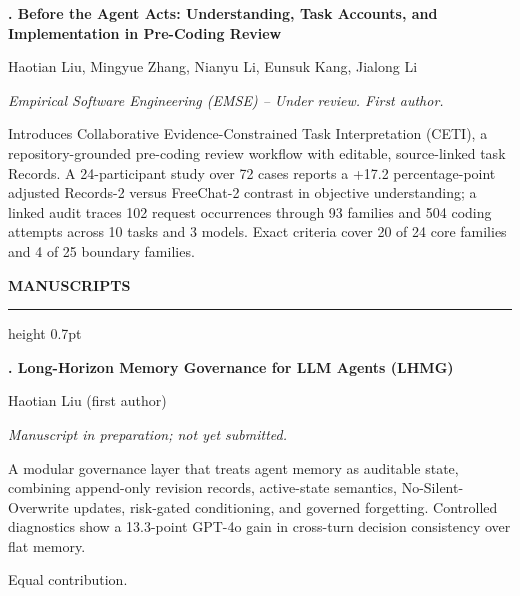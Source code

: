 \documentclass[10pt,a4paper]{article}
\newcommand{\pubsection}[1]{%
  \vspace{10pt}%
  {\sffamily\bfseries\fontsize{12.5}{15.2}\selectfont
    \color{navy}\MakeUppercase{#1}}\par
  \vspace{2pt}%
  {\color{rule}\hrule height 0.7pt}\vspace{7pt}%
}
\newcommand{\pubentry}[5]{%
  {\sffamily\bfseries\fontsize{11.7}{14.2}\selectfont #1}\par
  {\fontsize{10.5}{13.6}\selectfont #2}\par
  {\fontsize{10.4}{13.6}\selectfont\itshape #3}\par
  {\fontsize{10.35}{13.5}\selectfont #4}\par
  {\fontsize{10.6}{15.0}\selectfont #5}\par
  \vspace{8pt}%
}
\begin{document}
\pubentry
  {4. Before the Agent Acts: Understanding, Task Accounts, and\\Implementation in Pre-Coding Review}
  {Haotian Liu, Mingyue Zhang, Nianyu Li, Eunsuk Kang, Jialong Li}
  {Empirical Software Engineering (EMSE) -- Under review. First author.}
  {}
  {Introduces Collaborative Evidence-Constrained Task Interpretation (CETI),
   a repository-grounded pre-coding review workflow with editable,
   source-linked task Records. A 24-participant study over 72 cases reports a
   +17.2 percentage-point adjusted Records-2 versus FreeChat-2 contrast in
   objective understanding; a linked audit traces 102 request occurrences
   through 93 families and 504 coding attempts across 10 tasks and 3 models.
   Exact criteria cover 20 of 24 core families and 4 of 25 boundary families.}

\pubsection{Manuscripts}

\pubentry
  {5. Long-Horizon Memory Governance for LLM Agents (LHMG)}
  {Haotian Liu (first author)}
  {Manuscript in preparation; not yet submitted.}
  {}
  {A modular governance layer that treats agent memory as auditable state,
   combining append-only revision records, active-state semantics,
   No-Silent-Overwrite updates, risk-gated conditioning, and governed
   forgetting. Controlled diagnostics show a 13.3-point GPT-4o gain in
   cross-turn decision consistency over flat memory.}

\vfill
{\fontsize{9.0}{11.0}\selectfont * Equal contribution.}
\end{document}
